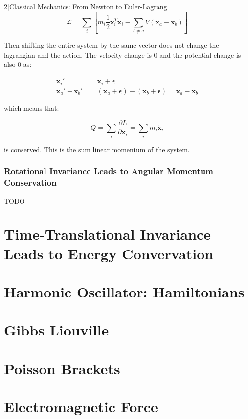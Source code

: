 \documentclass{article}
\begin{document}
\begin{multicols}{2}[Classical Mechanics: From Newton to Euler-Lagrang]
\begin{equation*}
    \mathcal{L} = \sum_i \left[ m_i \frac{1}{2} \dot{\bm{x}}_i^T \dot{\bm{x}}_i - \sum_{b \neq a} V(\bm{x}_a - \bm{x}_b) \right] 
\end{equation*}

Then shifting the entire system by the same vector does not change the lagrangian and the action. The velocity change is $0$ and the potential change is also $0$ as:

\begin{align*}
    \bm{x}_i' &= \bm{x}_i + \bm{\epsilon} \\
    \bm{x}_a' - \bm{x}_b' &= (\bm{x}_a + \bm{\epsilon}) - (\bm{x}_b + \bm{\epsilon}) = \bm{x}_a - \bm{x}_b
\end{align*}

which means that:

\begin{equation*}
    Q = \sum_i \frac{\partial L}{\partial \dot{\bm{x}}_i} = 
        \sum_i m_i \bm{\dot{x}}_i
\end{equation*}

is conserved. This is the sum linear momentum of the system.

\subsubsection{Rotational Invariance Leads to Angular Momentum Conservation}
TODO

\section{Time-Translational Invariance Leads to Energy Convervation}

\section{Harmonic Oscillator: Hamiltonians}

\section{Gibbs Liouville}

\section{Poisson Brackets}

\section{Electromagnetic Force}

\end{multicols}
\end{document}
